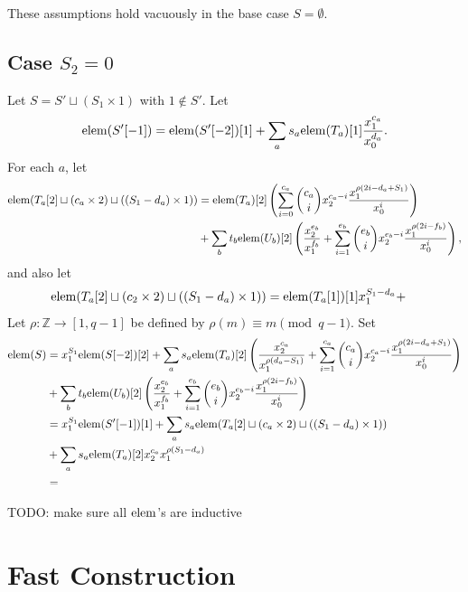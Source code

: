 \documentclass[12pt]{article}
\newcommand{\mb}[1]{\ensuremath{\mathbb{#1}}}
\newcommand{\ra}{\rightarrow}
\newcommand{\Z}{\mb{Z}}
\newcommand{\elem}{\ensuremath{{\rm elem}}}
\theoremstyle{plain}
\theoremstyle{definition}
\begin{document}
These assumptions hold vacuously in the base case $S = \emptyset$.



\subsection{Case \texorpdfstring{$S_2 = 0$}{S2 = 0}}
Let $S = S' \sqcup (S_1 \times 1)$ with $1 \notin S'$.  Let
\[
\elem(S'[-1]) = \elem(S'[-2])[1] + \sum_a s_a \elem(T_a)[1]\frac{x_1^{c_a}}{x_0^{d_a}}.
\]
For each $a$, let
\begin{align*}
\elem(T_a[2] \sqcup (c_a \times 2) \sqcup ((S_1 - d_a) \times 1))
&= \elem(T_a)[2]\left(\sum_{i=0}^{c_a} \binom{c_a}{i} x_2^{c_a - i}\frac{x_1^{\rho(2i - d_a + S_1)}}{x_0^i}\right) \\
&+ \sum_b t_b \elem(U_b)[2]\left(\frac{x_2^{e_b}}{x_1^{f_b}} + \sum_{i=1}^{e_b} \binom{e_b}{i} x_2^{e_b - i}\frac{x_1^{\rho(2i - f_b)}}{x_0^i}\right),
\end{align*}
and also let
\begin{align*}
\elem(T_a[2] \sqcup (c_2 \times 2) \sqcup ((S_1 - d_a) \times 1))
&= \elem(T_a[1])[1] x_1^{S_1 - d_a} + 
\end{align*}
Let $\rho: \Z \ra [1, q-1]$ be defined by $\rho(m) \equiv m \pmod{q-1}$.  Set
\begin{align*}
\elem(S)
&= x_1^{S_1}\elem(S[-2])[2] + \sum_a s_a \elem(T_a)[2]\left(\frac{x_2^{c_a}}{x_1^{\rho(d_a - S_1)}} + \sum_{i=1}^{c_a} \binom{c_a}{i} x_2^{c_a - i}\frac{x_1^{\rho(2i - d_a + S_1)}}{x_0^i}\right) \\
&+ \sum_b t_b\elem(U_b)[2]\left(\frac{x_2^{e_b}}{x_1^{f_b}} + \sum_{i=1}^{e_b} \binom{e_b}{i} x_2^{e_b - i}\frac{x_1^{\rho(2i - f_b)}}{x_0^i}\right) \\
&= x_1^{S_1}\elem(S'[-1])[1] + \sum_a s_a \elem(T_a[2] \sqcup (c_a \times 2) \sqcup ((S_1 - d_a) \times 1)) \\
&+ \sum_a s_a \elem(T_a)[2]x_2^{c_a}x_1^{\rho(S_1 - d_a)} \\
&= 
\end{align*}


TODO: make sure all $\elem$'s are inductive


\section{Fast Construction}
\end{document}
